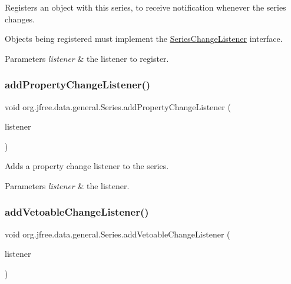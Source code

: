 Registers an object with this series, to receive notification whenever the series changes. 

Objects being registered must implement the \mbox{\hyperlink{interfaceorg_1_1jfree_1_1data_1_1general_1_1_series_change_listener}{Series\+Change\+Listener}} interface.


\begin{DoxyParams}{Parameters}
{\em listener} & the listener to register. \\
\hline
\end{DoxyParams}
\mbox{\label{classorg_1_1jfree_1_1data_1_1general_1_1_series_a4a2d0a038d4efeffebaafbbe4f7874df}} 
\subsubsection{\texorpdfstring{add\+Property\+Change\+Listener()}{addPropertyChangeListener()}}
{\footnotesize\ttfamily void org.\+jfree.\+data.\+general.\+Series.\+add\+Property\+Change\+Listener (\begin{DoxyParamCaption}\item[{Property\+Change\+Listener}]{listener }\end{DoxyParamCaption})}

Adds a property change listener to the series.


\begin{DoxyParams}{Parameters}
{\em listener} & the listener. \\
\hline
\end{DoxyParams}
\mbox{\label{classorg_1_1jfree_1_1data_1_1general_1_1_series_ae42a0e1a4aa0f483b202ec772836d5ed}} 
\subsubsection{\texorpdfstring{add\+Vetoable\+Change\+Listener()}{addVetoableChangeListener()}}
{\footnotesize\ttfamily void org.\+jfree.\+data.\+general.\+Series.\+add\+Vetoable\+Change\+Listener (\begin{DoxyParamCaption}\item[{Vetoable\+Change\+Listener}]{listener }\end{DoxyParamCaption})}

